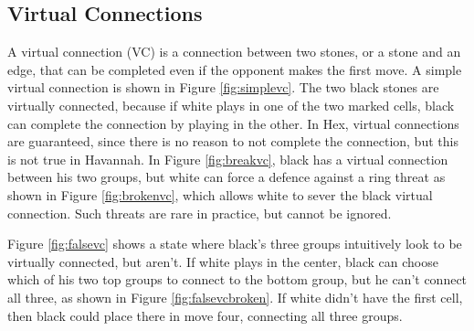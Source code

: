 \subsection{Virtual Connections}

A virtual connection (VC) is a connection between two stones, or a stone and an edge, that can be completed even if the opponent makes the first move. A simple virtual connection is shown in Figure \ref{fig:simplevc}. The two black stones are virtually connected, because if white plays in one of the two marked cells, black can complete the connection by playing in the other. In Hex, virtual connections are guaranteed, since there is no reason to not complete the connection, but this is not true in Havannah. In Figure \ref{fig:breakvc}, black has a virtual connection between his two groups, but white can force a defence against a ring threat as shown in Figure \ref{fig:brokenvc}, which allows white to sever the black virtual connection. Such threats are rare in practice, but cannot be ignored.

Figure \ref{fig:falsevc} shows a state where black's three groups intuitively look to be virtually connected, but aren't. If white plays in the center, black can choose which of his two top groups to connect to the bottom group, but he can't connect all three, as shown in Figure \ref{fig:falsevcbroken}. If white didn't have the first cell, then black could place there in move four, connecting all three groups.


